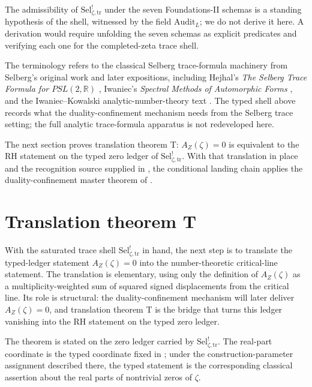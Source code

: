 \documentclass[11pt]{article}
\newcommand{\AZ}{A_{Z}(\zeta)}
\newcommand{\Sel}{\mathrm{Sel}^{!}_{\zeta,\mathrm{tr}}}
\theoremstyle{definition}
\begin{document}
The admissibility of \(\Sel\) under the seven Foundations-II schemas
\cite{TsiokosFoundationsII2026} is a standing hypothesis of the shell,
witnessed by the field \(\mathrm{Audit}_{L}\); we do not derive it
here.  A derivation would require unfolding the seven schemas as
explicit predicates and verifying each one for the completed-zeta
trace shell.

The terminology refers to the classical Selberg trace-formula
machinery from Selberg's original work \citep{Selberg1956} and
later expositions, including Hejhal's \emph{The Selberg Trace
Formula for \(PSL(2,\mathbb{R})\)} \citep{Hejhal1976,Hejhal1983},
Iwaniec's \emph{Spectral Methods of Automorphic Forms}
\citep{Iwaniec2002}, and the Iwaniec--Kowalski analytic-number-theory
text \citep{IwaniecKowalski2004}.  The typed shell above records
what the duality-confinement mechanism needs from the Selberg trace
setting; the full analytic trace-formula apparatus is not
redeveloped here.

The next section proves translation theorem T: \(\AZ=0\) is
equivalent to the RH statement on the typed zero ledger of \(\Sel\).
With that translation in place and the recognition source supplied
in , the conditional landing chain
applies the duality-confinement master theorem of
\cite{TsiokosSDTC2026}.
 

\section{Translation theorem T}
\label{sec:translation_theorem}

With the saturated trace shell \(\Sel\) in hand, the next step is to
translate the typed-ledger statement \(\AZ=0\) into the
number-theoretic critical-line statement.  The translation is
elementary, using only the definition of \(\AZ\) as a
multiplicity-weighted sum of squared signed displacements from the
critical line.  Its role is structural: the duality-confinement
mechanism will later deliver \(\AZ=0\), and translation theorem T is
the bridge that turns this ledger vanishing into the RH statement on
the typed zero ledger.

The theorem is stated on the zero ledger carried by \(\Sel\).  The
real-part coordinate is the typed coordinate fixed in
; under the construction-parameter
assignment described there, the typed statement is the corresponding
classical assertion about the real parts of nontrivial zeros of
\(\zeta\).
\end{document}
